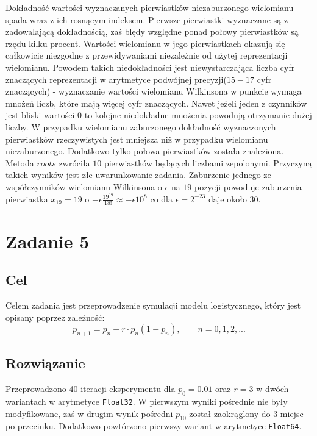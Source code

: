 \documentclass{article}
\begin{document}
\newpage

Dokładność wartości wyznaczanych pierwiastków niezaburzonego wielomianu spada wraz z ich rosnącym indeksem. Pierwsze pierwiastki wyznaczane są z zadowalającą dokładnością, zaś blędy względne ponad połowy pierwiastków są rzędu kilku procent.
Wartości wielomianu w jego pierwiastkach okazują się całkowicie niezgodne z przewidywaniami niezależnie od użytej reprezentacji wielomianu. Powodem takich niedokładności jest niewystarczająca liczba cyfr znaczących reprezentacji w arytmetyce podwójnej precyzji($15-17$ cyfr znaczących) - wyznaczanie wartości wielomianu Wilkinsona w punkcie wymaga mnożeń liczb, które mają więcej cyfr znaczących. Nawet jeżeli jeden z czynników jest bliski wartości $0$ to kolejne niedokładne mnożenia powodują otrzymanie dużej liczby.
\newline W przypadku wielomianu zaburzonego dokładność wyznaczonych pierwiastków rzeczywistych jest mniejsza niż w przypadku wielomianu niezaburzonego. Dodatkowo tylko połowa pierwiastków została znaleziona. Metoda $roots$ zwróciła $10$ pierwiastków będących liczbami zepolonymi. Przyczyną takich wyników jest złe uwarunkowanie zadania. Zaburzenie jednego ze współczynników wielomianu Wilkinsona o $\epsilon$ na $19$ pozycji powoduje zaburzenia pierwiastka $x_{19} = 19$ o $-\epsilon \frac{19^{19}}{18!} \approx -\epsilon 10^{8}$ co dla $\epsilon = 2^{-23}$ daje około $30$.

\section{Zadanie 5}
\subsection{Cel}
Celem zadania jest przeprowadzenie symulacji modelu logistycznego, który jest opisany poprzez zależność:
$$p_{n+1} = p_n + r \cdot p_n(1 - p_n), \qquad n = 0, 1, 2, ...$$

\subsection{Rozwiązanie}
Przeprowadzono 40 iteracji eksperymentu dla $p_0 = 0.01$ oraz $r=3$ w dwóch wariantach w arytmetyce \texttt{Float32}. W pierwszym wyniki pośrednie nie były modyfikowane, zaś w drugim wynik pośredni $p_{10}$ został zaokrąglony do 3 miejsc po przecinku.
Dodatkowo powtórzono pierwszy wariant w arytmetyce \texttt{Float64}.
\end{document}
